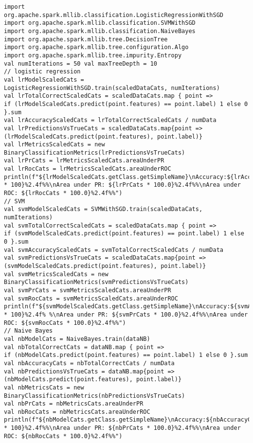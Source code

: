 \begin{lstlisting}
import
org.apache.spark.mllib.classification.LogisticRegressionWithSGD
import org.apache.spark.mllib.classification.SVMWithSGD
import org.apache.spark.mllib.classification.NaiveBayes
import org.apache.spark.mllib.tree.DecisionTree
import org.apache.spark.mllib.tree.configuration.Algo
import org.apache.spark.mllib.tree.impurity.Entropy
val numIterations = 50 val maxTreeDepth = 10
// logistic regression
val lrModelScaledCats = LogisticRegressionWithSGD.train(scaledDataCats, numIterations)
val lrTotalCorrectScaledCats = scaledDataCats.map { point =>
if (lrModelScaledCats.predict(point.features) == point.label) 1 else 0 }.sum
val lrAccuracyScaledCats = lrTotalCorrectScaledCats / numData
val lrPredictionsVsTrueCats = scaledDataCats.map{point =>
(lrModelScaledCats.predict(point.features), point.label)}
val lrMetricsScaledCats = new BinaryClassificationMetrics(lrPredictionsVsTrueCats)
val lrPrCats = lrMetricsScaledCats.areaUnderPR
val lrRocCats = lrMetricsScaledCats.areaUnderROC
println(f"${lrModelScaledCats.getClass.getSimpleName}\nAccuracy:${lrAccuracyScaledCats * 100}%2.4f%%\nArea under PR: ${lrPrCats * 100.0}%2.4f%%\nArea under ROC: ${lrRocCats * 100.0}%2.4f%%")
// SVM
val svmModelScaledCats = SVMWithSGD.train(scaledDataCats, numIterations)
val svmTotalCorrectScaledCats = scaledDataCats.map { point =>
if (svmModelScaledCats.predict(point.features) == point.label) 1 else 0 }.sum
val svmAccuracyScaledCats = svmTotalCorrectScaledCats / numData
val svmPredictionsVsTrueCats = scaledDataCats.map{point =>
(svmModelScaledCats.predict(point.features), point.label)}
val svmMetricsScaledCats = new BinaryClassificationMetrics(svmPredictionsVsTrueCats)
val svmPrCats = svmMetricsScaledCats.areaUnderPR
val svmRocCats = svmMetricsScaledCats.areaUnderROC
println(f"${svmModelScaledCats.getClass.getSimpleName}\nAccuracy:${svmAccuracyScaledCats * 100}%2.4f% %\nArea under PR: ${svmPrCats * 100.0}%2.4f%%\nArea under ROC: ${svmRocCats * 100.0}%2.4f%%")
// Naive Bayes
val nbModelCats = NaiveBayes.train(dataNB)
val nbTotalCorrectCats = dataNB.map { point =>
if (nbModelCats.predict(point.features) == point.label) 1 else 0 }.sum
val nbAccuracyCats = nbTotalCorrectCats / numData
val nbPredictionsVsTrueCats = dataNB.map{point =>
(nbModelCats.predict(point.features), point.label)}
val nbMetricsCats = new BinaryClassificationMetrics(nbPredictionsVsTrueCats)
val nbPrCats = nbMetricsCats.areaUnderPR
val nbRocCats = nbMetricsCats.areaUnderROC
println(f"${nbModelCats.getClass.getSimpleName}\nAccuracy:${nbAccuracyCats * 100}%2.4f%%\nArea under PR: ${nbPrCats * 100.0}%2.4f%%\nArea under ROC: ${nbRocCats * 100.0}%2.4f%%")

\end{lstlisting}
